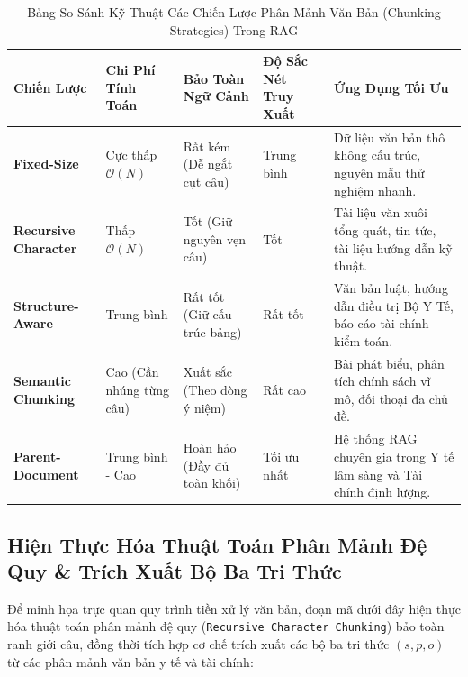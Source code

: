 \documentclass[12pt,a4paper]{report}
\begin{document}
\begin{table}[H]
\centering
\small
\renewcommand{\arraystretch}{1.25}
\caption{Bảng So Sánh Kỹ Thuật Các Chiến Lược Phân Mảnh Văn Bản (Chunking Strategies) Trong RAG}
\label{tab:chunking_strategies}
\begin{tabularx}{\textwidth}{>{\RaggedRight\arraybackslash\bfseries}p{2.6cm} >{\RaggedRight\arraybackslash}p{2.2cm} >{\RaggedRight\arraybackslash}p{2.2cm} >{\RaggedRight\arraybackslash}p{2.2cm} Y}
\toprule
\textbf{Chiến Lược} & \textbf{Chi Phí Tính Toán} & \textbf{Bảo Toàn Ngữ Cảnh} & \textbf{Độ Sắc Nét Truy Xuất} & \textbf{Ứng Dụng Tối Ưu} \\
\midrule
Fixed-Size & Cực thấp $\mathcal{O}(N)$ & Rất kém (Dễ ngắt cụt câu) & Trung bình & Dữ liệu văn bản thô không cấu trúc, nguyên mẫu thử nghiệm nhanh. \\
Recursive Character & Thấp $\mathcal{O}(N)$ & Tốt (Giữ nguyên vẹn câu) & Tốt & Tài liệu văn xuôi tổng quát, tin tức, tài liệu hướng dẫn kỹ thuật. \\
Structure-Aware & Trung bình & Rất tốt (Giữ cấu trúc bảng) & Rất tốt & Văn bản luật, hướng dẫn điều trị Bộ Y Tế, báo cáo tài chính kiểm toán. \\
Semantic Chunking & Cao (Cần nhúng từng câu) & Xuất sắc (Theo dòng ý niệm) & Rất cao & Bài phát biểu, phân tích chính sách vĩ mô, đối thoại đa chủ đề. \\
Parent-Document & Trung bình - Cao & Hoàn hảo (Đầy đủ toàn khối) & Tối ưu nhất & Hệ thống RAG chuyên gia trong Y tế lâm sàng và Tài chính định lượng. \\
\bottomrule
\end{tabularx}
\end{table}

\subsection{Hiện Thực Hóa Thuật Toán Phân Mảnh Đệ Quy \& Trích Xuất Bộ Ba Tri Thức}

Để minh họa trực quan quy trình tiền xử lý văn bản, đoạn mã dưới đây hiện thực hóa thuật toán phân mảnh đệ quy (\texttt{Recursive Character Chunking}) bảo toàn ranh giới câu, đồng thời tích hợp cơ chế trích xuất các bộ ba tri thức $(s, p, o)$ từ các phân mảnh văn bản y tế và tài chính:
\end{document}
